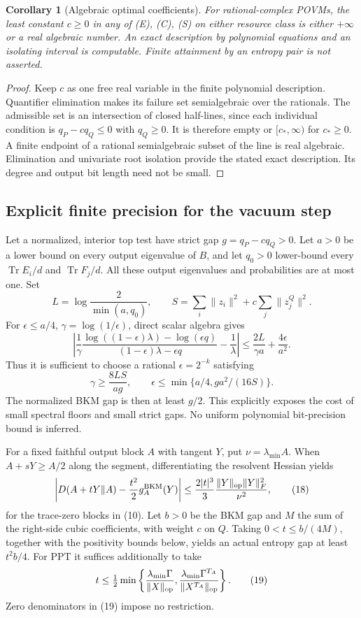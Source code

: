 \documentclass[11pt]{article}
\newtheorem{corollary}{Corollary}
\newcommand{\Tr}{\operatorname{Tr}}
\begin{document}
\begin{corollary}[Algebraic optimal coefficients]
For rational-complex POVMs, the least constant $c\geq0$ in any of (E), (C),
(S) on either resource class is either $+\infty$ or a real algebraic number.
An exact description by polynomial equations and an isolating interval is
computable. Finite attainment by an entropy pair is not asserted.
\end{corollary}
\begin{proof}
Keep $c$ as one free real variable in the finite polynomial description.
Quantifier elimination makes its failure set semialgebraic over the rationals.
The admissible set is an intersection of closed half-lines, since each
individual condition is $q_P-cq_Q\leq0$ with $q_Q\geq0$. It is therefore
empty or $[c_*,\infty)$ for $c_*\geq0$. A finite endpoint of a rational
semialgebraic subset of the line is real algebraic. Elimination and univariate
root isolation provide the stated exact description. Its degree and output
bit length need not be small.
\end{proof}

\subsection{Explicit finite precision for the vacuum step}
Let a normalized, interior top test have strict gap
$g=q_P-cq_Q>0$. Let $a>0$ be a lower bound on every output eigenvalue of
$B$, and let $q_0>0$ lower-bound every $\Tr E_i/d$ and $\Tr F_j/d$.
All these output eigenvalues and probabilities are at most one. Set
\[
 L=\log\frac{2}{\min(a,q_0)},\qquad
 S=\sum_i\|z_i\|^2+c\sum_j\|z_j^Q\|^2.
\]
For $\epsilon\leq a/4$, $\gamma=\log(1/\epsilon)$, direct scalar algebra gives
\[
 \left|\frac{1}{\gamma}
 \frac{\log((1-\epsilon)\lambda)-\log(\epsilon q)}
 {(1-\epsilon)\lambda-\epsilon q}-\frac1\lambda\right|
 \leq\frac{2L}{\gamma a}+\frac{4\epsilon}{a^2}.               \tag{16}
\]
Thus it is sufficient to choose a rational $\epsilon=2^{-k}$ satisfying
\[
 \gamma\geq\frac{8LS}{ag},\qquad
 \epsilon\leq\min\{a/4,ga^2/(16S)\}.                         \tag{17}
\]
The normalized BKM gap is then at least $g/2$. This explicitly exposes the
cost of small spectral floors and small strict gaps. No uniform polynomial
bit-precision bound is inferred.

For a fixed faithful output block $A$ with tangent $Y$, put $\nu=\lambda_{\min}A$.
When $A+sY\geq A/2$ along the segment, differentiating the resolvent Hessian
yields
\[
 \left|D(A+tY\Vert A)-\frac{t^2}{2}g_A^{\mathrm{BKM}}(Y)\right|
 \leq\frac{2|t|^3}{3}\frac{\|Y\|_{\rm op}\|Y\|_F^2}{\nu^2}, \tag{18}
\]
for the trace-zero blocks in (10). Let $b>0$ be the BKM gap and $M$ the sum
of the right-side cubic coefficients, with weight $c$ on $Q$.
Taking $0<t\leq b/(4M)$, together with the positivity bounds below, yields
an actual entropy gap at least $t^2b/4$.
For PPT it suffices additionally to take
\[
 t\leq\tfrac12\min\left\{
 \frac{\lambda_{\min}\Gamma}{\|X\|_{\rm op}},
 \frac{\lambda_{\min}\Gamma^{T_A}}{\|X^{T_A}\|_{\rm op}}
 \right\}.                                                   \tag{19}
\]
Zero denominators in (19) impose no restriction.
\end{document}
